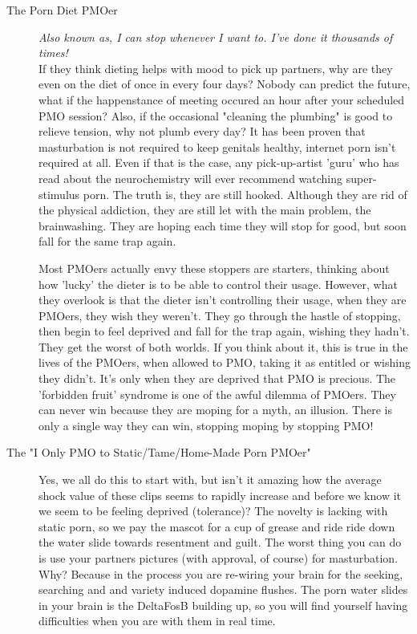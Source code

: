 \documentclass[easypeasy]{subfiles}
\begin{document}
\begin{description}
    \item [The Porn Diet PMOer] \textit{Also known as, I can stop whenever I want to. I've done it thousands of times!}\\ If they think dieting helps with mood to pick up partners, why are they even on the diet of once in every four days? Nobody can predict the future, what if the happenstance of meeting occured an hour after your scheduled PMO session? Also, if the occasional "cleaning the plumbing" is good to relieve tension, why not plumb every day? It has been proven that masturbation is not required to keep genitals healthy, internet porn isn't required at all. Even if that is the case, any pick-up-artist 'guru' who has read about the neurochemistry will ever recommend watching super-stimulus porn. The truth is, they are still hooked. Although they are rid of the physical addiction, they are still let with the main problem, the brainwashing. They are hoping each time they will stop for good, but soon fall for the same trap again.

  Most PMOers actually envy these stoppers are starters, thinking about how 'lucky' the dieter is to be able to control their usage. However, what they overlook is that the dieter isn't controlling their usage, when they are PMOers, they wish they weren't. They go through the hastle of stopping, then begin to feel deprived and fall for the trap again, wishing they hadn't. They get the worst of both worlds. If you think about it, this is true in the lives of the PMOers, when allowed to PMO, taking it as entitled or wishing they didn't. It's only when they are deprived that PMO is precious. The 'forbidden fruit' syndrome is one of the awful dilemma of PMOers. They can never win because they are moping for a myth, an illusion. There is only a single way they can win, stopping moping by stopping PMO!

\item [The "I Only PMO to Static/Tame/Home-Made Porn PMOer"] Yes, we all do this to start with, but isn't it amazing how the average shock value of these clips seems to rapidly increase and before we know it we seem to be feeling deprived (tolerance)? The novelty is lacking with static porn, so we pay the mascot for a cup of grease and ride ride down the water slide towards resentment and guilt. The worst thing you can do is use your partners pictures (with approval, of course) for masturbation. Why? Because in the process you are re-wiring your brain for the seeking, searching and and variety induced dopamine flushes. The porn water slides in your brain is the DeltaFosB building up, so you will find yourself having difficulties when you are with them in real time.


\end{description}
\end{document}
